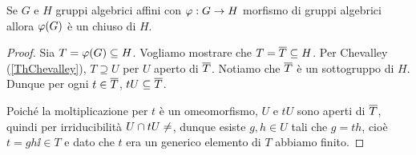 \begin{corollary}
Se $G$ e $H$ gruppi algebrici affini con $\varphi:G\to H$ morfismo di gruppi algebrici allora $\varphi(G)$ \`e un chiuso di $H$.
\end{corollary}
\begin{proof}
Sia $T=\varphi(G)\subseteq H$. Vogliamo mostrare che $T=\overline{T}\subseteq H$. Per Chevalley (\ref{ThChevalley}), $T\supseteq U$ per $U$ aperto di $\overline{T}$. Notiamo che $\overline{T}$ \`e un sottogruppo di $H$. Dunque per ogni $t\in \overline{T}$, $tU\subseteq \overline{T}$.

Poich\'e la moltiplicazione per $t$ \`e un omeomorfismo, $U$ e $tU$ sono aperti di $\overline{T}$, quindi per irriducibilit\`a $U\cap tU\neq \empty$, dunque esiste $g,h\in U$ tali che $g=th$, cio\`e $t=gh\ii\in T$ e dato che $t$ era un generico elemento di $T$ abbiamo finito.
\end{proof}

